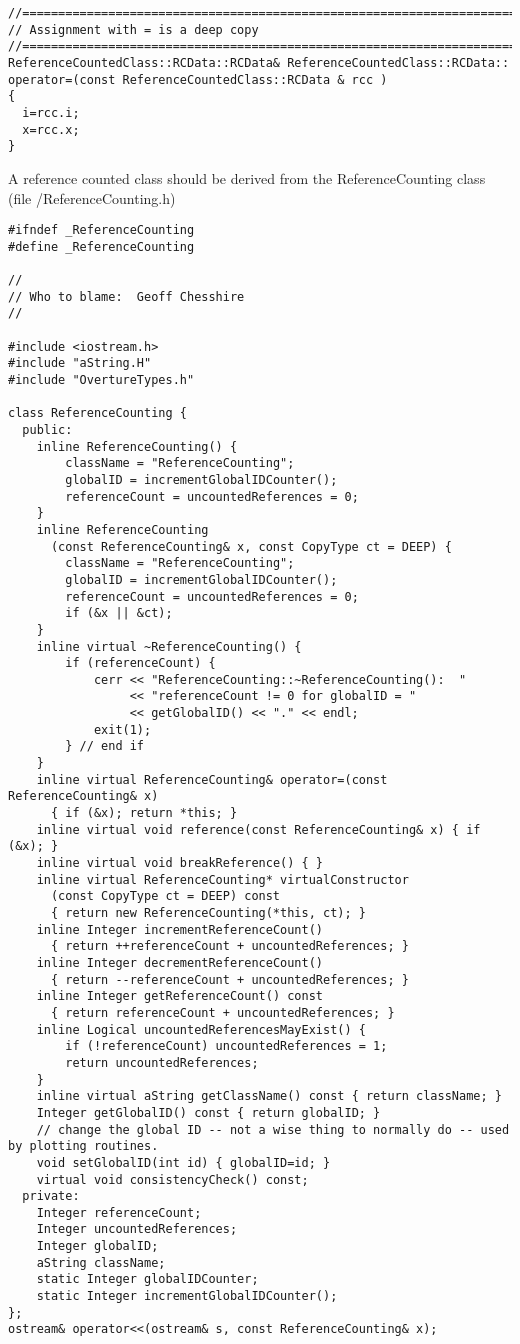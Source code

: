{\begin{verbatim}
//========================================================================================================
// Assignment with = is a deep copy
//========================================================================================================
ReferenceCountedClass::RCData::RCData& ReferenceCountedClass::RCData::
operator=(const ReferenceCountedClass::RCData & rcc )
{
  i=rcc.i;
  x=rcc.x;
}

\end{verbatim}
}



A reference counted class should be derived from the 
{\ff ReferenceCounting} class
(file {\ff /Reference\-Counting.h})
{\footnotesize
\begin{verbatim}
#ifndef _ReferenceCounting
#define _ReferenceCounting

//
// Who to blame:  Geoff Chesshire
//

#include <iostream.h>
#include "aString.H"
#include "OvertureTypes.h"

class ReferenceCounting {
  public:
    inline ReferenceCounting() {
        className = "ReferenceCounting";
        globalID = incrementGlobalIDCounter();
        referenceCount = uncountedReferences = 0;
    }
    inline ReferenceCounting
      (const ReferenceCounting& x, const CopyType ct = DEEP) {
        className = "ReferenceCounting";
        globalID = incrementGlobalIDCounter();
        referenceCount = uncountedReferences = 0;
        if (&x || &ct);
    }
    inline virtual ~ReferenceCounting() {
        if (referenceCount) {
            cerr << "ReferenceCounting::~ReferenceCounting():  "
                 << "referenceCount != 0 for globalID = "
                 << getGlobalID() << "." << endl;
            exit(1);
        } // end if
    }
    inline virtual ReferenceCounting& operator=(const ReferenceCounting& x)
      { if (&x); return *this; }
    inline virtual void reference(const ReferenceCounting& x) { if (&x); }
    inline virtual void breakReference() { }
    inline virtual ReferenceCounting* virtualConstructor
      (const CopyType ct = DEEP) const
      { return new ReferenceCounting(*this, ct); }
    inline Integer incrementReferenceCount()
      { return ++referenceCount + uncountedReferences; }
    inline Integer decrementReferenceCount()
      { return --referenceCount + uncountedReferences; }
    inline Integer getReferenceCount() const
      { return referenceCount + uncountedReferences; }
    inline Logical uncountedReferencesMayExist() {
        if (!referenceCount) uncountedReferences = 1;
        return uncountedReferences;
    }
    inline virtual aString getClassName() const { return className; }
    Integer getGlobalID() const { return globalID; }
    // change the global ID -- not a wise thing to normally do -- used by plotting routines.
    void setGlobalID(int id) { globalID=id; } 
    virtual void consistencyCheck() const;
  private:
    Integer referenceCount;
    Integer uncountedReferences;
    Integer globalID;
    aString className;
    static Integer globalIDCounter;
    static Integer incrementGlobalIDCounter();
};
ostream& operator<<(ostream& s, const ReferenceCounting& x);


\end{verbatim}}
